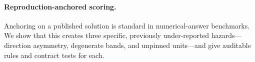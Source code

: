 \paragraph{Reproduction-anchored scoring.}
Anchoring on a published solution is standard in numerical-answer benchmarks. We show that this creates three specific, previously under-reported hazards---direction asymmetry, degenerate bands, and unpinned units---and give auditable rules and contract tests for each.

